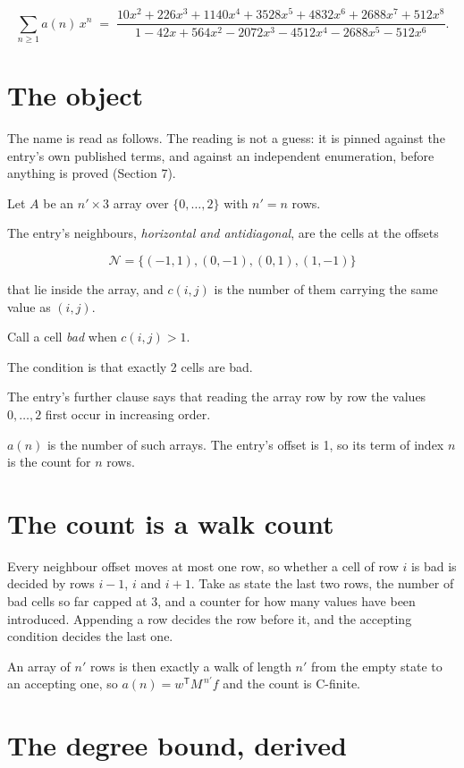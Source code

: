 \documentclass[11pt]{article}
\theoremstyle{definition}
\begin{document}
\[\sum_{n \ge 1} a(n)\,x^n \;=\; \frac{10x^{2} + 226x^{3} + 1140x^{4} + 3528x^{5} + 4832x^{6} + 2688x^{7} + 512x^{8}}{1 - 42x + 564x^{2} - 2072x^{3} - 4512x^{4} - 2688x^{5} - 512x^{6}}.\]

\section{The object}

The name is read as follows. The reading is not a guess: it is pinned against the entry's own published terms, and against an independent enumeration, before anything is proved (Section 7).

Let $A$ be an $n' \times 3$ array over $\{0,\dots,2\}$ with $n' = n$ rows.

The entry's neighbours, {\itshape horizontal and antidiagonal}, are the cells at the offsets

\[\mathcal{N} = \{(-1,1), (0,-1), (0,1), (1,-1)\}\]

that lie inside the array, and $c(i,j)$ is the number of them carrying the same value as $(i,j)$.

Call a cell {\itshape bad} when $c(i,j) > 1$.

The condition is that exactly 2 cells are bad.

The entry's further clause says that reading the array row by row the values $0,\dots,2$ first occur in increasing order.

$a(n)$ is the number of such arrays. The entry's offset is 1, so its term of index $n$ is the count for $n$ rows.

\section{The count is a walk count}

Every neighbour offset moves at most one row, so whether a cell of row $i$ is bad is decided by rows $i-1$, $i$ and $i+1$. Take as state the last two rows, the number of bad cells so far capped at 3, and a counter for how many values have been introduced. Appending a row decides the row before it, and the accepting condition decides the last one.

An array of $n'$ rows is then exactly a walk of length $n'$ from the empty state to an accepting one, so $a(n) = w^{\mathsf T}M^{\,n'}f$ and the count is C-finite.

\section{The degree bound, derived}
\end{document}
